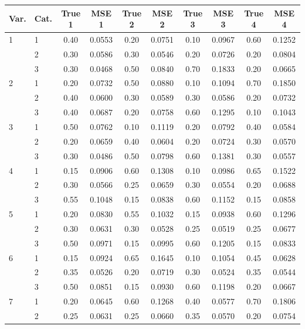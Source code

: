 \begin{longtable}{llcccccccc}
  \toprule
\textbf{Var.} & \textbf{Cat.} & \textbf{True 1} & \textbf{MSE 1} & \textbf{True 2} & \textbf{MSE 2} & \textbf{True 3} & \textbf{MSE 3} & \textbf{True 4} & \textbf{MSE 4} \\ 
  \midrule
1 & 1 & 0.40 & 0.0553 & 0.20 & 0.0751 & 0.10 & 0.0967 & 0.60 & 0.1252 \\ 
   & 2 & 0.30 & 0.0586 & 0.30 & 0.0546 & 0.20 & 0.0726 & 0.20 & 0.0804 \\ 
   & 3 & 0.30 & 0.0468 & 0.50 & 0.0840 & 0.70 & 0.1833 & 0.20 & 0.0665 \\ 
  2 & 1 & 0.20 & 0.0732 & 0.50 & 0.0880 & 0.10 & 0.1094 & 0.70 & 0.1850 \\ 
   & 2 & 0.40 & 0.0600 & 0.30 & 0.0589 & 0.30 & 0.0586 & 0.20 & 0.0732 \\ 
   & 3 & 0.40 & 0.0687 & 0.20 & 0.0758 & 0.60 & 0.1295 & 0.10 & 0.1043 \\ 
  3 & 1 & 0.50 & 0.0762 & 0.10 & 0.1119 & 0.20 & 0.0792 & 0.40 & 0.0584 \\ 
   & 2 & 0.20 & 0.0659 & 0.40 & 0.0604 & 0.20 & 0.0724 & 0.30 & 0.0570 \\ 
   & 3 & 0.30 & 0.0486 & 0.50 & 0.0798 & 0.60 & 0.1381 & 0.30 & 0.0557 \\ 
  4 & 1 & 0.15 & 0.0906 & 0.60 & 0.1308 & 0.10 & 0.0986 & 0.65 & 0.1522 \\ 
   & 2 & 0.30 & 0.0566 & 0.25 & 0.0659 & 0.30 & 0.0554 & 0.20 & 0.0688 \\ 
   & 3 & 0.55 & 0.1048 & 0.15 & 0.0838 & 0.60 & 0.1152 & 0.15 & 0.0858 \\ 
  5 & 1 & 0.20 & 0.0830 & 0.55 & 0.1032 & 0.15 & 0.0938 & 0.60 & 0.1296 \\ 
   & 2 & 0.30 & 0.0631 & 0.30 & 0.0528 & 0.25 & 0.0519 & 0.25 & 0.0677 \\ 
   & 3 & 0.50 & 0.0971 & 0.15 & 0.0995 & 0.60 & 0.1205 & 0.15 & 0.0833 \\ 
  6 & 1 & 0.15 & 0.0924 & 0.65 & 0.1645 & 0.10 & 0.1054 & 0.45 & 0.0628 \\ 
   & 2 & 0.35 & 0.0526 & 0.20 & 0.0719 & 0.30 & 0.0524 & 0.35 & 0.0544 \\ 
   & 3 & 0.50 & 0.0851 & 0.15 & 0.0930 & 0.60 & 0.1198 & 0.20 & 0.0667 \\ 
  7 & 1 & 0.20 & 0.0645 & 0.60 & 0.1268 & 0.40 & 0.0577 & 0.70 & 0.1806 \\ 
   & 2 & 0.25 & 0.0631 & 0.25 & 0.0660 & 0.35 & 0.0570 & 0.20 & 0.0754 \\ 

\end{longtable}
